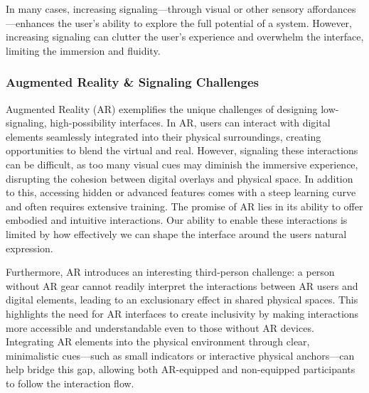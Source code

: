 In many cases, increasing signaling—through visual or other sensory affordances—enhances the user's ability to explore the full potential of a system.
However, increasing signaling can clutter the user's experience and overwhelm the interface, limiting the immersion and fluidity.

\subsubsection{ Augmented Reality \& Signaling Challenges}

Augmented Reality (AR) exemplifies the unique challenges of designing low-signaling, high-possibility interfaces\cite{10.1145/2254556.2254569}.
In AR, users can interact with digital elements seamlessly integrated into their physical surroundings, creating opportunities to blend the virtual and real.
However, signaling these interactions can be difficult, as too many visual cues may diminish the immersive experience, disrupting the cohesion between digital overlays and physical space.
In addition to this, accessing hidden or advanced features comes with a steep learning curve and often requires extensive training.
The promise of AR lies in its ability to offer embodied and intuitive interactions. 
Our ability to enable these interactions is limited by how effectively we can shape the interface around the users natural expression.


Furthermore, AR introduces an interesting third-person challenge: a person without AR gear cannot readily interpret the interactions between AR users and digital elements, leading to an exclusionary effect in shared physical spaces.
This highlights the need for AR interfaces to create inclusivity by making interactions more accessible and understandable even to those without AR devices.
Integrating AR elements into the physical environment through clear, minimalistic cues—such as small indicators or interactive physical anchors—can help bridge this gap, allowing both AR-equipped and non-equipped participants to follow the interaction flow.

